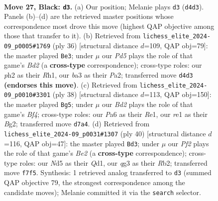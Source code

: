 \documentclass[11pt]{article}
\begin{document}
\clearpage

\begin{figure}[p]\centering
\begin{subfigure}{0.46\textwidth}\centering
\resizebox{\linewidth}{!}{%
\newchessgame
\chessboard[
  setfen={r3r2k/bp1b1pp1/pq2p3/3n3P/3p4/BP4QB/P2P1PKP/RN2R3 b - - 6 27},
  showmover=false,
  pgfstyle=straightmove, color=movearrow, markmove={d4-d3}
]}
\caption{}
\end{subfigure}\hfill
\begin{subfigure}{0.46\textwidth}\centering
\resizebox{\linewidth}{!}{%
\newchessgame
\chessboard[
  setfen={r3k2r/pp1nbpp1/1qp1p1p1/4P3/2PP4/3B2P1/PP1BQ2P/1K1R3R w kq - 1 19},
  showmover=false,
  pgfstyle=straightmove, color=movearrow, markmove={d2-e3}
]}
\caption{}
\end{subfigure}
\\[4pt]
\begin{subfigure}{0.46\textwidth}\centering
\resizebox{\linewidth}{!}{%
\newchessgame
\chessboard[
  setfen={r1q3k1/1p1bbpp1/p3pnr1/7p/2P2B1P/PPN3P1/4QPB1/R3R1K1 w - - 0 20},
  showmover=false,
  pgfstyle=straightmove, color=movearrow, markmove={f4-g5}
]}
\caption{}
\end{subfigure}\hfill
\begin{subfigure}{0.46\textwidth}\centering
\resizebox{\linewidth}{!}{%
\newchessgame
\chessboard[
  setfen={r3r1k1/p4ppp/1p1b1qb1/3p4/3P4/4PN1P/PR2BPP1/3Q1RK1 w - - 2 21},
  showmover=false,
  pgfstyle=straightmove, color=movearrow, markmove={e2-d3}
]}
\caption{}
\end{subfigure}
\caption{\textbf{Move 27, Black: \texttt{d3}.} (a) Our position; Melanie plays \texttt{d3} (\texttt{d4d3}). Panels (b)--(d) are the retrieved master positions whose correspondence most drove this move (highest QAP objective among those that transfer to it). (b) Retrieved from \texttt{lichess\_elite\_2024-09\_p0005\#1769} (ply 36) [structural distance $d$=109, QAP obj=79]: the master played \texttt{Be3}; under $\mu$ our \emph{Pd5} plays the role of that game's \emph{Bd2} (a \textbf{cross-type} correspondence); cross-type roles: our \emph{p}h2 as their \emph{R}h1, our \emph{b}a3 as their \emph{P}a2; transferred move \texttt{d4d3} \textbf{(endorses this move)}. (c) Retrieved from \texttt{lichess\_elite\_2024-09\_p0010\#3301} (ply 38) [structural distance $d$=113, QAP obj=150]: the master played \texttt{Bg5}; under $\mu$ our \emph{Bd2} plays the role of that game's \emph{Bf4}; cross-type roles: our \emph{P}a6 as their \emph{R}e1, our \emph{r}e1 as their \emph{B}g2; transferred move \texttt{d7a4}. (d) Retrieved from \texttt{lichess\_elite\_2024-09\_p0031\#1307} (ply 40) [structural distance $d$=116, QAP obj=47]: the master played \texttt{Bd3}; under $\mu$ our \emph{Pf2} plays the role of that game's \emph{Be2} (a \textbf{cross-type} correspondence); cross-type roles: our \emph{N}d5 as their \emph{Q}d1, our \emph{q}g3 as their \emph{R}b2; transferred move \texttt{f7f5}. Synthesis: 1 retrieved analog transferred to \texttt{d3} (summed QAP objective 79, the strongest correspondence among the candidate moves); Melanie committed it via the \texttt{search} selector.}
\label{fig:thought-m53}
\end{figure}
\end{document}
